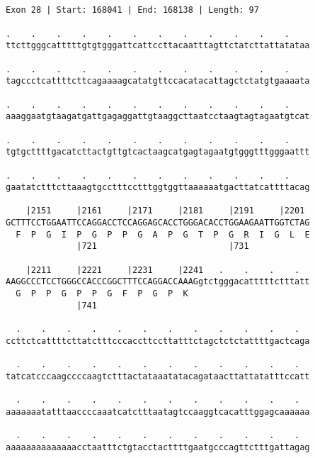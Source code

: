 \documentclass{article}
\begin{document}
\begin{Verbatim}
                                             
 
Exon 28 | Start: 168041 | End: 168138 | Length: 97
 
.    .    .    .    .    .    .    .    .    .    .    .    
ttcttgggcatttttgtgtgggattcattccttacaatttagttctatcttattatataa
                                                            
.    .    .    .    .    .    .    .    .    .    .    .    
tagccctcattttcttcagaaaagcatatgttccacatacattagctctatgtgaaaata
                                                            
.    .    .    .    .    .    .    .    .    .    .    .    
aaaggaatgtaagatgattgagaggattgtaaggcttaatcctaagtagtagaatgtcat
                                                            
.    .    .    .    .    .    .    .    .    .    .    .    
tgtgcttttgacatcttactgttgtcactaagcatgagtagaatgtgggtttgggaattt
                                                            
.    .    .    .    .    .    .    .    .    .    .    .    
gaatatctttcttaaagtgcctttcctttggtggttaaaaaatgacttatcattttacag
                                                            
    |2151     |2161     |2171     |2181     |2191     |2201 
GCTTTCCTGGAATTCCAGGACCTCCAGGAGCACCTGGGACACCTGGAAGAATTGGTCTAG
  F  P  G  I  P  G  P  P  G  A  P  G  T  P  G  R  I  G  L  E
              |721                          |731            
  
    |2211     |2221     |2231     |2241   .    .    .    .  
AAGGCCCTCCTGGGCCACCCGGCTTTCCAGGACCAAAGgtctgggacatttttctttatt
  G  P  P  G  P  P  G  F  P  G  P  K                        
              |741                                          
  
  .    .    .    .    .    .    .    .    .    .    .    .  
ccttctcattttcttatctttcccaccttccttatttctagctctctattttgactcaga
                                                            
  .    .    .    .    .    .    .    .    .    .    .    .  
tatcatcccaagccccaagtctttactataaatatacagataacttattatatttccatt
                                                            
  .    .    .    .    .    .    .    .    .    .    .    .  
aaaaaaatatttaaccccaaatcatctttaatagtccaaggtcacatttggagcaaaaaa
                                                            
  .    .    .    .    .    .    .    .    .    .    .    .  
aaaaaaaaaaaaaacctaatttctgtacctacttttgaatgcccagttctttgattagag
                                                            

\end{Verbatim}
\end{document}
